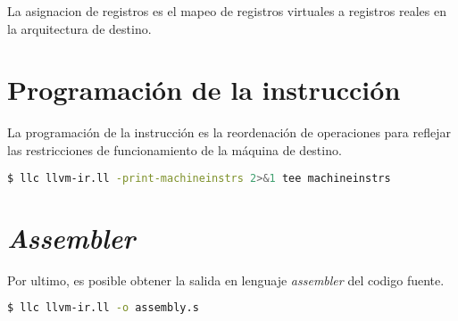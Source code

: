 La asignacion de registros es el mapeo de registros virtuales a registros 
reales en la arquitectura de destino.

\section{Programación de la instrucción}

La programación de la instrucción es la reordenación de operaciones para 
reflejar las restricciones de funcionamiento de la máquina de destino.

\begin{lstlisting}[label=comandoC, caption= Comando de compilación del archivo codigo-ejemplo.c \cite{repositorio} para CLANG/LLVM., language=bash]
    $ llc llvm-ir.ll -print-machineinstrs 2>&1 tee machineinstrs \end{lstlisting}

\section{\emph{Assembler}}
Por ultimo, es posible obtener la salida en lenguaje \emph{assembler} del codigo fuente.

\begin{lstlisting}[label=comandoC, caption= Comando de compilación del archivo codigo-ejemplo.c \cite{repositorio} para CLANG/LLVM., language=bash]
    $ llc llvm-ir.ll -o assembly.s \end{lstlisting}
